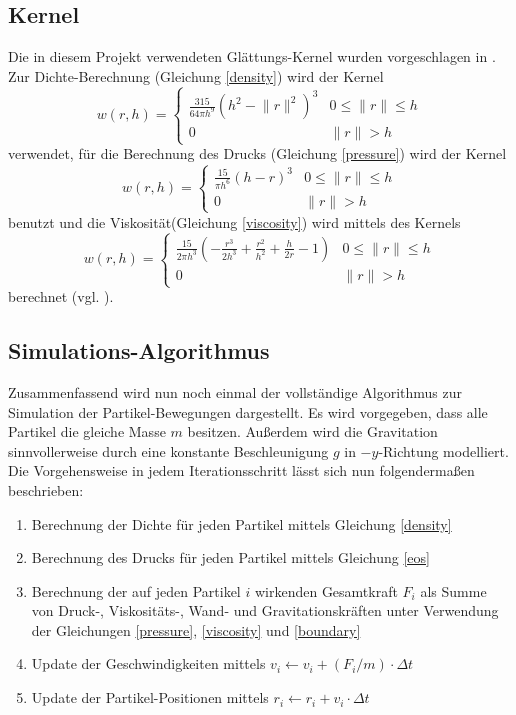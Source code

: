 \subsection*{Kernel}
Die in diesem Projekt verwendeten Glättungs-Kernel wurden vorgeschlagen in \cite{FluidSim}. Zur Dichte-Berechnung (Gleichung \ref{density}) wird der Kernel
\[
w(r,h) = \begin{cases}
\frac{315}{64\pi h^9} (h^2 - \lVert r \rVert^2)^3 & 0\leq \lVert r \rVert\leq h\\
0 & \lVert r \rVert > h
\end{cases}
\]
verwendet, für die Berechnung des Drucks (Gleichung \ref{pressure}) wird der Kernel
\[
w(r,h) = \begin{cases}
\frac{15}{\pi h^6} (h-r)^3 & 0\leq \lVert r \rVert\leq h\\
0 & \lVert r \rVert > h
\end{cases}
\]
benutzt und die Viskosität(Gleichung \ref{viscosity}) wird mittels des Kernels
\[
w(r,h) = \begin{cases}
\frac{15}{2\pi h^3} \left(-\frac{r^3}{2h^3} + \frac{r^2}{h^2} + \frac{h}{2r} - 1\right) & 0\leq \lVert r \rVert\leq h\\
0 & \lVert r \rVert > h
\end{cases}
\]
berechnet (vgl. \cite[S. 157]{FluidSim}).


\subsection*{Simulations-Algorithmus}
Zusammenfassend wird nun noch einmal der vollständige Algorithmus zur Simulation der Partikel-Bewegungen dargestellt. Es wird vorgegeben, dass alle Partikel die gleiche Masse $m$ besitzen. Außerdem wird die Gravitation sinnvollerweise durch eine konstante Beschleunigung $g$ in $-y$-Richtung modelliert. Die Vorgehensweise in jedem Iterationsschritt lässt sich nun folgendermaßen beschrieben:
\begin{enumerate}
\item Berechnung der Dichte für jeden Partikel mittels Gleichung \ref{density}
\item Berechnung des Drucks für jeden Partikel mittels Gleichung \ref{eos}
\item Berechnung der auf jeden Partikel $i$ wirkenden Gesamtkraft $F_i$ als Summe von Druck-, Viskositäts-, Wand- und Gravitationskräften unter Verwendung der Gleichungen \ref{pressure}, \ref{viscosity} und \ref{boundary}
\item Update der Geschwindigkeiten mittels $v_i \leftarrow v_i + (F_i / m) \cdot \Delta t$
\item Update der Partikel-Positionen mittels $r_i \leftarrow r_i + v_i \cdot \Delta t$
\end{enumerate}






